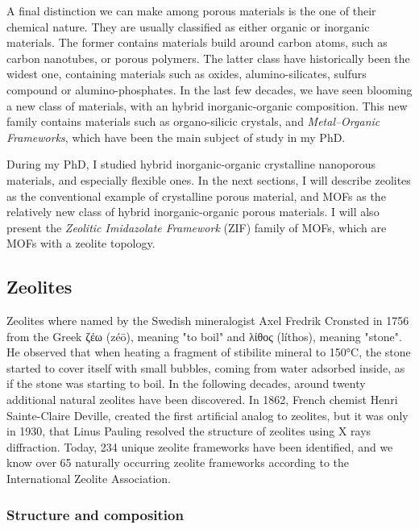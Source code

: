\documentclass[thesis]{subfiles}
\begin{document}
A final distinction we can make among porous materials is the one of their
chemical nature. They are usually classified as either organic or inorganic
materials. The former contains materials build around carbon atoms, such as
carbon nanotubes, or porous polymers. The latter class have historically been
the widest one, containing materials such as oxides, alumino-silicates, sulfurs
compound or alumino-phosphates. In the last few decades, we have seen blooming a
new class of materials, with an hybrid inorganic-organic composition. This new
family contains materials such as organo-silicic crystals, and
\emph{Metal--Organic Frameworks}, which have been the main subject of study in my
PhD.

During my PhD, I studied hybrid inorganic-organic crystalline nanoporous
materials, and especially flexible ones. In the next sections, I will describe
zeolites as the conventional example of crystalline porous material, and MOFs as
the relatively new class of hybrid inorganic-organic porous materials. I will
also present the \emph{Zeolitic Imidazolate Framework} (ZIF) family of MOFs,
which are MOFs with a zeolite topology.

\subsection{Zeolites}

Zeolites where named by the Swedish mineralogist Axel Fredrik Cronsted in
1756\cite{Ferey2001} from the Greek \textgreek{ζέω} (zéō), meaning "to boil" and
\textgreek{λίθος} (líthos), meaning "stone". He observed that when heating a
fragment of stibilite mineral to 150°C, the stone started to cover itself with
small bubbles, coming from water adsorbed inside, as if the stone was starting
to boil. In the following decades, around twenty additional natural zeolites
have been discovered. In 1862, French chemist Henri Sainte-Claire Deville,
created the first artificial analog to zeolites, but it was only in 1930, that
Linus Pauling resolved the structure of zeolites using X rays diffraction.
Today, 234 unique zeolite frameworks have been identified, and we know over 65
naturally occurring zeolite frameworks according to the International Zeolite
Association\cite{iza-website}.

\subsubsection{Structure and composition}
\end{document}
